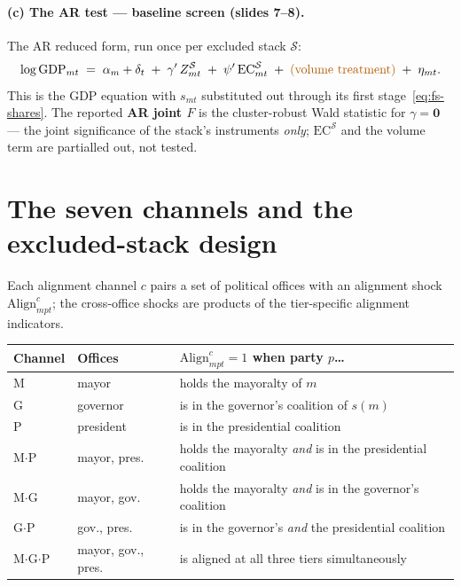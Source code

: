\documentclass{article}
\newcommand{\tog}[1]{\textcolor{toggle}{#1}}
\newcommand{\Align}{\mathrm{Align}}
\newcommand{\EC}{\mathrm{EC}}
\newcommand{\cS}{\mathcal{S}}
\newcommand{\bzero}{\mathbf{0}}
\begin{document}
\paragraph{(c) The AR test --- baseline screen (slides 7--8).}
The AR reduced form, run once per excluded stack $\cS$:
\begin{equation}\label{eq:rf}
  \log\mathrm{GDP}_{mt}
  \;=\;
  \alpha_m + \delta_t
  \;+\; \gamma'\,Z^{\cS}_{mt}
  \;+\; \psi'\,\EC^{\cS}_{mt}
  \;+\; \tog{(\text{volume treatment})}
  \;+\; \eta_{mt}.
\end{equation}
This is the GDP equation with $s_{mt}$ substituted out through its first
stage~\eqref{eq:fs-shares}. The reported \textbf{AR joint $F$} is the
cluster-robust Wald statistic for $\gamma=\bzero$ --- the joint significance of
the stack's instruments \emph{only}; $\EC^{\cS}$ and the volume term are
partialled out, not tested.

\section{The seven channels and the excluded-stack design}\label{sec:stacks}

Each alignment channel $c$ pairs a set of political offices with an alignment
shock $\Align^{c}_{mpt}$; the cross-office shocks are products of the
tier-specific alignment indicators.

\begin{center}
\begin{tabular}{lll}
\toprule
Channel & Offices & $\Align^{c}_{mpt}=1$ when party $p$\ldots \\
\midrule
M               & mayor                & holds the mayoralty of $m$ \\
G               & governor             & is in the governor's coalition of $s(m)$ \\
P               & president            & is in the presidential coalition \\
M$\cdot$P       & mayor, pres.         & holds the mayoralty \emph{and} is in the presidential coalition \\
M$\cdot$G       & mayor, gov.          & holds the mayoralty \emph{and} is in the governor's coalition \\
G$\cdot$P       & gov., pres.          & is in the governor's \emph{and} the presidential coalition \\
M$\cdot$G$\cdot$P & mayor, gov., pres. & is aligned at all three tiers simultaneously \\
\bottomrule
\end{tabular}
\end{center}
\end{document}
